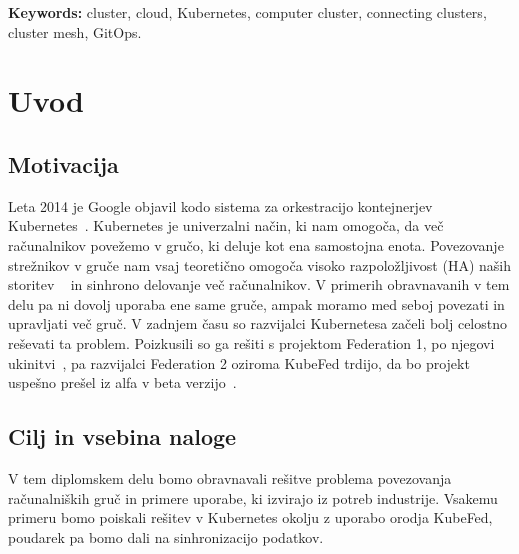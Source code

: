 \documentclass[a4paper, 12pt]{book}
\newcommand{\tkeywordsEn}{cluster, cloud, Kubernetes, computer cluster, connecting clusters, cluster mesh, GitOps}
\newcommand{\clearemptydoublepage}{\newpage{\pagestyle{empty}\cleardoublepage}}
\begin{document}
\bigskip
\noindent\textbf{Keywords:} \tkeywordsEn.
\clearemptydoublepage
\mainmatter
\setcounter{page}{1}
\pagestyle{fancy}
\chapter{Uvod}
\label{uvod}
\section{Motivacija}
Leta 2014 je Google objavil kodo sistema za orkestracijo kontejnerjev Kubernetes~\cite{what-is-Kubernetes}.
Kubernetes  je univerzalni način, ki nam omogoča, da več računalnikov povežemo v gručo, ki deluje kot ena samostojna enota. 
Povezovanje strežnikov v gruče nam vsaj teoretično omogoča visoko razpoložljivost (HA) naših storitev ~\cite{mastering-Kubernetes} in sinhrono delovanje več računalnikov.
V primerih obravnavanih v tem delu pa ni dovolj uporaba ene same gruče, ampak moramo med seboj povezati in upravljati več gruč.
V zadnjem času so razvijalci Kubernetesa začeli bolj celostno reševati ta problem.
Poizkusili so ga rešiti s projektom Federation 1, po njegovi ukinitvi~\cite{kubernetes-federation-evolution}, pa razvijalci Federation 2 oziroma KubeFed trdijo, da bo projekt uspešno prešel iz alfa v beta verzijo~\cite{kubefed-repo}.
\section{Cilj in vsebina naloge}
V tem diplomskem delu bomo obravnavali rešitve problema povezovanja računalniških gruč in primere uporabe, ki izvirajo iz potreb industrije.
Vsakemu primeru bomo poiskali rešitev v Kubernetes okolju z uporabo orodja KubeFed, poudarek pa bomo dali na sinhronizacijo podatkov.
\end{document}
